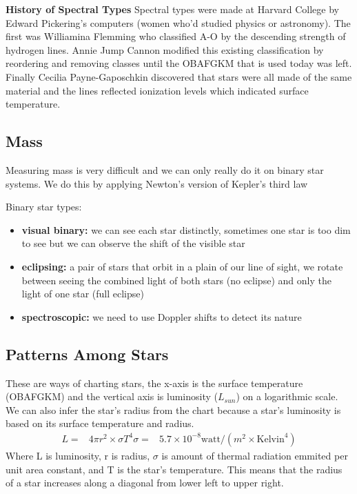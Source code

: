 \documentclass[12pt]{article}
\begin{document}
\textbf{History of Spectral Types}
Spectral types were made at Harvard College by Edward Pickering's computers (women who'd studied physics or astronomy). The first was Williamina Flemming who classified A-O by the descending strength of hydrogen lines. Annie Jump Cannon modified this existing classification by reordering and removing classes until the OBAFGKM that is used today was left. Finally Cecilia Payne-Gaposchkin discovered that stars were all made of the same material and the lines reflected ionization levels which indicated surface temperature.

\subsection{Mass}
Measuring mass is very difficult and we can only really do it on binary star systems. We do this by applying Newton's version of Kepler's third law

Binary star types:
\begin{itemize}
\item \textbf{visual binary: } we can see each star distinctly, sometimes one star is too dim to see but we can observe the shift of the visible star
\item \textbf{eclipsing: }  a pair of stars that orbit in a plain of our line of sight, we rotate between seeing the combined light of both stars (no eclipse) and only the light of one star (full eclipse)
\item \textbf{spectroscopic: } we need to use Doppler shifts to detect its nature
\end{itemize}

\subsection{Patterns Among Stars}
These are ways of charting stars, the x-axis is the surface temperature (OBAFGKM) and the vertical axis is luminosity ($L_{sun}$) on a logarithmic scale. We can also infer the star's radius from the chart because a star's luminosity is based on its surface temperature and radius.
\begin{align*}
L = & 4\pi r^2 \times \sigma T^4
\sigma = & 5.7 \times 10^{-8}\text{watt}/(m^2 \times \text{Kelvin}^4)
\end{align*}
Where L is luminosity, r is radius, $\sigma$ is amount of thermal radiation emmited per unit area constant, and T is the star's temperature. This means that the radius of a star increases along a diagonal from lower left to upper right.
\end{document}
